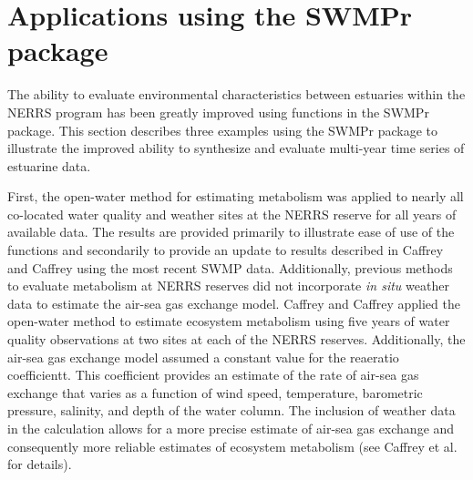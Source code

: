 \documentclass[10pt,letterpaper]{article}\usepackage[]{graphicx}\usepackage[]{color}
\begin{document}
\section*{Applications using the SWMPr package}

The ability to evaluate environmental characteristics between estuaries within the \ac{NERRS} program has been greatly improved using functions in the SWMPr package.  This section describes three examples using the SWMPr package to illustrate the improved ability to synthesize and evaluate multi-year time series of estuarine data.  

First, the open-water method for estimating metabolism was applied to nearly all co-located water quality and weather sites at the \ac{NERRS} reserve for all years of available data.  The results are provided primarily to illustrate ease of use of the functions and secondarily to provide an update to results described in Caffrey \cite{Caffrey03} and Caffrey \cite{Caffrey04} using the most recent \ac{SWMP} data.  Additionally, previous methods to evaluate metabolism at \ac{NERRS} reserves did not incorporate \textit{in situ} weather data to estimate the air-sea gas exchange model.  Caffrey \cite{Caffrey03} and Caffrey \cite{Caffrey04} applied the open-water method to estimate ecosystem metabolism using five years of water quality observations at two sites at each of the \ac{NERRS} reserves.  Additionally, the air-sea gas exchange model assumed a constant value for the reaeratio coefficientt.  This coefficient provides an estimate of the rate of air-sea gas exchange that varies as a function of wind speed, temperature, barometric pressure, salinity, and depth of the water column.  The inclusion of weather data in the calculation allows for a more precise estimate of air-sea gas exchange and consequently more reliable estimates of ecosystem metabolism (see Caffrey et al. \cite{Caffrey14} for details).
\end{document}
